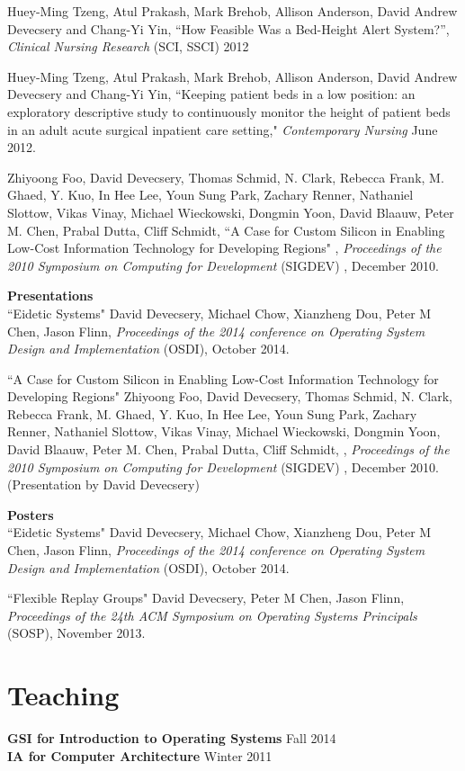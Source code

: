 \documentclass[margin, 10pt]{res} %
\begin{document}
\begin{resume}
Huey-Ming Tzeng, Atul Prakash, Mark Brehob, Allison Anderson, David
Andrew Devecsery and Chang-Yi Yin, ``How Feasible Was a Bed-Height
Alert System?”, {\sl Clinical Nursing Research} (SCI, SSCI) 2012

Huey-Ming Tzeng, Atul Prakash, Mark Brehob, Allison Anderson, David
Andrew Devecsery and Chang-Yi Yin, ``Keeping patient beds in a low
position: an exploratory descriptive study to continuously monitor the
height of patient beds in an adult acute surgical inpatient care
setting," {\sl Contemporary Nursing} June 2012.

Zhiyoong Foo, David Devecsery, Thomas Schmid, N. Clark, Rebecca Frank,
M. Ghaed, Y. Kuo, In Hee Lee, Youn Sung Park, Zachary Renner,
Nathaniel Slottow, Vikas Vinay, Michael Wieckowski, Dongmin Yoon,
David Blaauw, Peter M. Chen, Prabal Dutta, Cliff Schmidt, ``A Case for
Custom Silicon in Enabling Low-Cost Information Technology for
Developing Regions" , {\sl Proceedings of the 2010 Symposium on Computing
for Development} (SIGDEV) , December 2010.

\textbf{Presentations}\\
``Eidetic Systems" David Devecsery, Michael Chow, Xianzheng Dou,
Peter M Chen, Jason Flinn, {\sl Proceedings of the 2014 conference
on Operating System Design and Implementation} (OSDI), October 2014.

``A Case for Custom Silicon in Enabling Low-Cost Information
Technology for Developing Regions" Zhiyoong Foo, David Devecsery,
Thomas Schmid, N. Clark, Rebecca Frank, M. Ghaed, Y. Kuo, In Hee Lee,
Youn Sung Park, Zachary Renner, Nathaniel Slottow, Vikas Vinay,
Michael Wieckowski, Dongmin Yoon, David Blaauw, Peter M. Chen, Prabal
Dutta, Cliff Schmidt,  , {\sl Proceedings of the 2010 Symposium on
Computing for Development} (SIGDEV) , December 2010. (Presentation by
David Devecsery)

\textbf{Posters}\\
``Eidetic Systems" David Devecsery, Michael Chow, Xianzheng Dou,
Peter M Chen, Jason Flinn, {\sl Proceedings of the 2014 conference
on Operating System Design and Implementation} (OSDI), October 2014.

``Flexible Replay Groups" David Devecsery, Peter M Chen, Jason Flinn,
{\sl Proceedings of the 24th ACM Symposium on Operating Systems
Principals} (SOSP), November 2013.

\section{Teaching}
\textbf{GSI for Introduction to Operating Systems} \hfill Fall 2014 \\
\textbf{IA for Computer Architecture} \hfill Winter 2011 \\


\end{resume}
\end{document}
